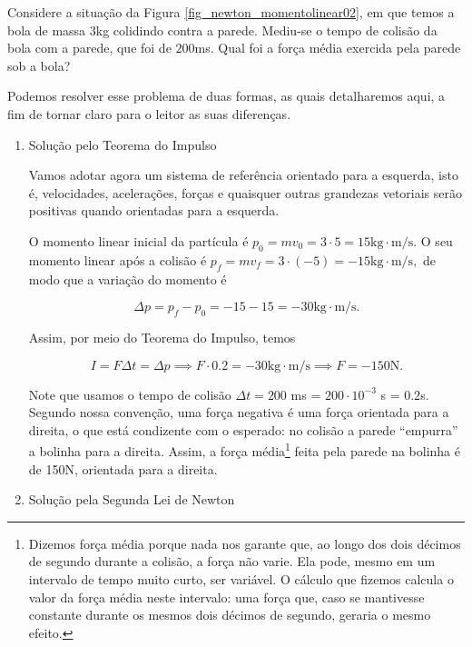 \begin{exemplo}[Nível I]\label{exemplo_newton_teoremaimpulsoex01}

Considere a situação da Figura \ref{fig_newton_momentolinear02}, em que temos a bola de massa $3$kg colidindo contra a parede. Mediu-se o tempo de colisão da bola com a parede, que foi de $200$ms. Qual foi a força média exercida pela parede sob a bola?

\resolucao

Podemos resolver esse problema de duas formas, as quais detalharemos aqui, a fim de tornar claro para o leitor as suas diferenças.

\begin{enumerate}
    \item [(i)] Solução pelo Teorema do Impulso

    Vamos adotar agora um sistema de referência orientado para a esquerda, isto é, velocidades, acelerações, forças e quaisquer outras grandezas vetoriais serão positivas quando orientadas para a esquerda.

    O momento linear inicial da partícula é $p_0=mv_0= 3 \cdot 5=  15 \text{kg} \cdot \text{m/s}.$ O seu momento linear após a colisão é $p_f=mv_f= 3 \cdot (-5)=  -15 \text{kg} \cdot \text{m/s},$ de modo que a variação do momento é

    $$ \Delta p = p_f - p_0 = -15 - 15 = -30 \text{kg} \cdot \text{m/s}.$$

    Assim, por meio do Teorema do Impulso, temos

$$  I = F \Delta t = \Delta p \implies F \cdot 0.2 = -30 \text{kg} \cdot \text{m/s} \implies \boxed{F = -150 \text{N}}. $$

Note que usamos o tempo de colisão $\Delta t = 200$ ms = $200 \cdot 10^{-3}$ s = $ 0.2$s. Segundo nossa convenção, uma força negativa é uma força orientada para a direita, o que está condizente com o esperado: no colisão a parede ``empurra'' a bolinha para a direita. Assim, a força média\footnote{Dizemos força média porque nada nos garante que, ao longo dos dois décimos de segundo durante a colisão, a força não varie. Ela pode, mesmo em um intervalo de tempo muito curto, ser variável. O cálculo que fizemos calcula o valor da força média neste intervalo: uma força que, caso se mantivesse constante durante os mesmos dois décimos de segundo, geraria o mesmo efeito.} feita pela parede na bolinha é de 150N, orientada para a direita.
    


    \item [(ii)] Solução pela Segunda Lei de Newton


\end{enumerate}
\end{exemplo}
